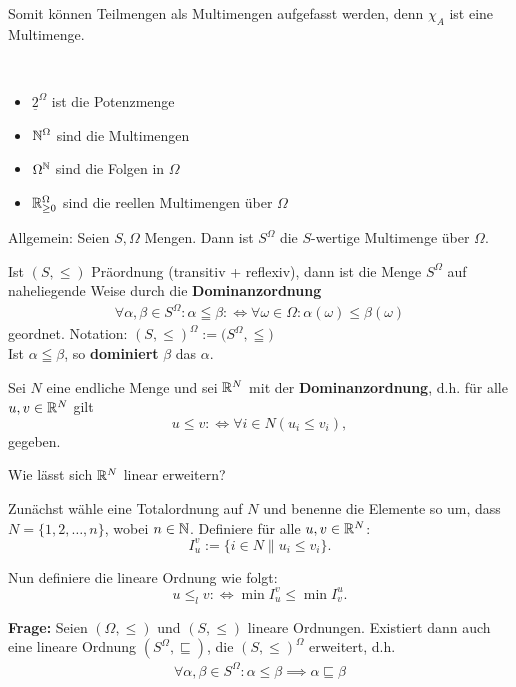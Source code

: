 Somit können Teilmengen als Multimengen aufgefasst werden, denn $\chi_A$ ist eine Multimenge.

\begin{beispiel}\
\begin{itemize}
\item $\underline{2}^\Omega$ ist die Potenzmenge
\item $\mathbb{N}^\Omega$ sind die Multimengen
\item $\Omega^{\mathbb{N}}$ sind die Folgen in $\Omega$
\item $\mathbb{R}_{\geq0}^\Omega$ sind die reellen Multimengen über $\Omega$
\end{itemize}
\end{beispiel}

Allgemein: Seien $S,\Omega$ Mengen. Dann ist $S^\Omega$ die $S$-wertige Multimenge über $\Omega$.

\begin{lemma}
Ist $(S,\leq)$ Präordnung (transitiv + reflexiv), dann ist die Menge $S^\Omega$ auf naheliegende Weise durch die \textbf{Dominanzordnung}
\begin{align*}
\forall\alpha,\beta\in S^\Omega:\alpha\leqq\beta:\Longleftrightarrow\forall\omega\in\Omega:\alpha(\omega)\leq\beta(\omega)
\end{align*}
geordnet. Notation: $(S,\leq)^\Omega:=\big(S^\Omega,\leqq\big)$\\
Ist $\alpha\leqq\beta$, so \textbf{dominiert} $\beta$ das $\alpha$.
\end{lemma}

\begin{aufgabe}
    Sei $N$ eine endliche Menge und 
    sei $\mathbb{R}^N$ mit der \textbf{Dominanzordnung}, d.h. für alle $u,v \in \mathbb{R}^N$ gilt
    $$u \leq v :\iff \forall i \in N (u_i \leq v_i),$$
    gegeben.
    
    Wie lässt sich $\mathbb{R}^N$ linear erweitern?
\end{aufgabe}

\begin{lösung}
    Zunächst wähle eine Totalordnung auf $ N $ und benenne die Elemente so um, dass
    $N = \{1,2,\ldots,n\}$, wobei $n \in \mathbb{N}$.
    Definiere für alle $u,v \in \mathbb{R}^N$:
    $$ I^v_u := \{i \in N \| u_i \leq v_i\}.$$

    Nun definiere die lineare Ordnung wie folgt:
    $$ u \leq_l v :\iff \min I^v_u \leq \min I^u_v.$$
\end{lösung}

\textbf{Frage:} Seien $(\Omega,\leq)$ und $(S,\leq)$ lineare Ordnungen. Existiert dann auch eine lineare Ordnung $(S^\Omega,\sqsubseteq)$, die $(S,\leq)^\Omega$ erweitert, d.h.
\begin{align*}
\forall\alpha,\beta\in S^\Omega:\alpha\leq\beta\implies\alpha\sqsubseteq\beta
\end{align*}

